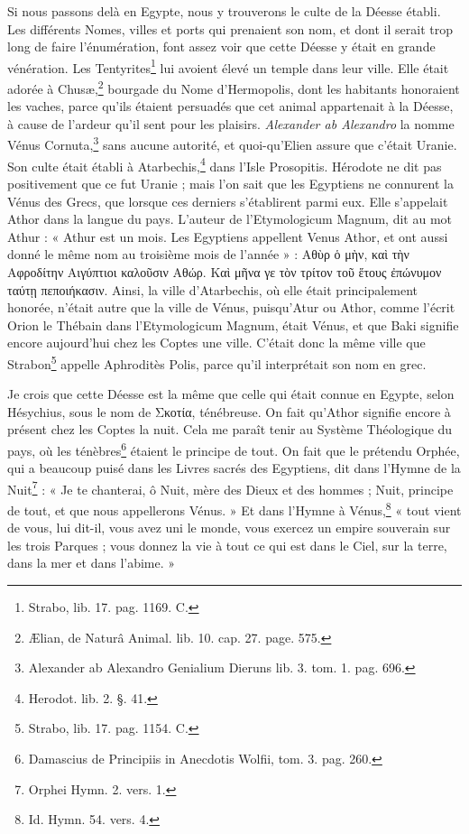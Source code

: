 \documentclass[a4paper, 18pt, oneside]{article}
\begin{document}
Si nous passons delà en Egypte, nous y trouverons le culte de la Déesse établi. Les différents Nomes, villes et ports qui prenaient son nom, et dont il serait trop long de faire l'énumération, font assez voir que cette Déesse y était en grande vénération. Les Tentyrites\footnote{Strabo, lib. 17. pag. 1169. C.} lui avoient élevé un temple dans leur ville. Elle était adorée à Chusæ,\footnote{Ælian, de Naturâ Animal. lib. 10. cap. 27. page. 575.} bourgade du Nome d'Hermopolis, dont les habitants honoraient les vaches, parce qu'ils étaient persuadés que cet animal appartenait à la Déesse, à cause de l'ardeur qu'il sent pour les plaisirs. \emph{Alexander ab Alexandro} la nomme Vénus Cornuta,\footnote{Alexander ab Alexandro Genialium Dieruns lib. 3. tom. 1. pag. 696.} sans aucune autorité, et quoi-qu'Elien assure que c'était Uranie. Son culte était établi à Atarbechis,\footnote{Herodot. lib. 2. §. 41.} dans l'Isle Prosopitis. Hérodote ne dit pas positivement que ce fut Uranie ; mais l'on sait que les Egyptiens ne connurent la Vénus des Grecs, que lorsque ces derniers s'établirent parmi eux. Elle s'appelait Athor dans la langue du pays. L'auteur de l'Etymologicum Magnum, dit au mot Athur : « Athur est un mois. Les Egyptiens appellent Venus Athor, et ont aussi donné le même nom au troisième mois de l'année » : Αθὺρ ὁ μὴν, καὶ τὴν Αφροδίτην Αιγύπτιοι καλοῦσιν Αθώρ. Καὶ μῆνα γε τὸν τρίτον τοῦ ἕτους ἐπώνυμον ταύτῃ πεποιήκασιν. Ainsi, la ville d'Atarbechis, où elle était principalement honorée, n'était autre que la ville de Vénus, puisqu'Atur ou Athor, comme l'écrit Orion le Thébain dans l'Etymologicum Magnum, était Vénus, et que Baki signifie encore aujourd'hui chez les Coptes une ville. C'était donc la même ville que Strabon\footnote{Strabo, lib. 17. pag. 1154. C.} appelle Aphroditès Polis, parce qu'il interprétait son nom en grec.

Je crois que cette Déesse est la même que celle qui était connue en Egypte, selon Hésychius, sous le nom de Σκοτία, ténébreuse. On fait qu'Athor signifie encore à présent chez les Coptes la nuit. Cela me paraît tenir au Système Théologique du pays, où les ténèbres\footnote{Damascius de Principiis in Anecdotis Wolfii, tom. 3. pag. 260.} étaient le principe de tout. On fait que le prétendu Orphée, qui a beaucoup puisé dans les Livres sacrés des Egyptiens, dit dans l'Hymne de la Nuit\footnote{Orphei Hymn. 2. vers. 1.} : « Je te chanterai, ô Nuit, mère des Dieux et des hommes ; Nuit, principe de tout, et que nous appellerons Vénus. » Et dans l'Hymne à Vénus,\footnote{Id. Hymn. 54. vers. 4.} « tout vient de vous, lui dit-il, vous avez uni le monde, vous exercez un empire souverain sur les trois Parques ; vous donnez la vie à tout ce qui est dans le Ciel, sur la terre, dans la mer et dans l'abime. »
\end{document}
